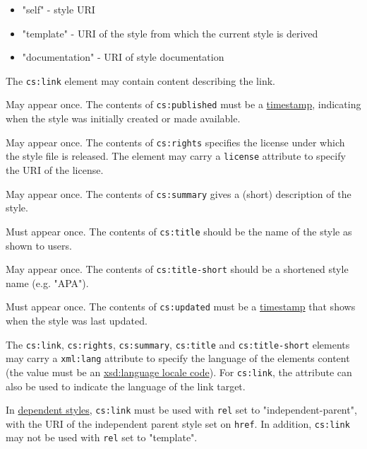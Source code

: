 \begin{description}
\begin{itemize}
\tightlist
\item
  "self" - style URI
\item
  "template" - URI of the style from which the current style is derived
\item
  "documentation" - URI of style documentation
\end{itemize}

The \texttt{cs:link} element may contain content describing the link.
\item[\texttt{cs:published} (optional)]
May appear once. The contents of \texttt{cs:published} must be a
\href{http://books.xmlschemata.org/relaxng/ch19-77049.html}{timestamp},
indicating when the style was initially created or made available.
\item[\texttt{cs:rights} (optional)]
May appear once. The contents of \texttt{cs:rights} specifies the
license under which the style file is released. The element may carry a
\texttt{license} attribute to specify the URI of the license.
\item[\texttt{cs:summary} (optional)]
May appear once. The contents of \texttt{cs:summary} gives a (short)
description of the style.
\item[\texttt{cs:title}]
Must appear once. The contents of \texttt{cs:title} should be the name
of the style as shown to users.
\item[\texttt{cs:title-short} (optional)]
May appear once. The contents of \texttt{cs:title-short} should be a
shortened style name (e.g. "APA").
\item[\texttt{cs:updated}]
Must appear once. The contents of \texttt{cs:updated} must be a
\href{http://books.xmlschemata.org/relaxng/ch19-77049.html}{timestamp}
that shows when the style was last updated.
\end{description}

The \texttt{cs:link}, \texttt{cs:rights}, \texttt{cs:summary},
\texttt{cs:title} and \texttt{cs:title-short} elements may carry a
\texttt{xml:lang} attribute to specify the language of the
element\textquotesingle s content (the value must be an
\href{http://books.xmlschemata.org/relaxng/ch19-77191.html}{xsd:language
locale code}). For \texttt{cs:link}, the attribute can also be used to
indicate the language of the link target.

In \protect\hyperlink{dependent-styles}{dependent styles},
\texttt{cs:link} must be used with \texttt{rel} set to
"independent-parent", with the URI of the independent parent style set
on \texttt{href}. In addition, \texttt{cs:link} may not be used with
\texttt{rel} set to "template".

